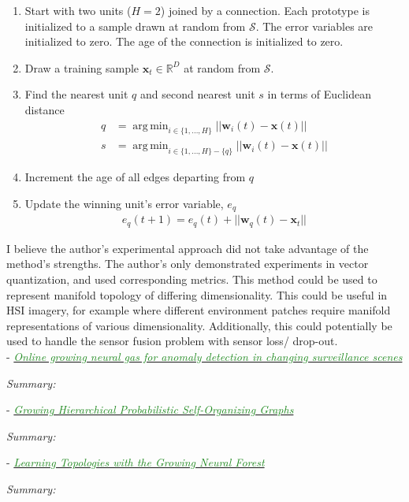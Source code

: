 \documentclass[]{article}
\DeclareMathOperator*{\argmin}{arg\,min}
\newcommand{\paperentry}[4]{
            \hangindent=1cm
            \textcolor{red}{\cite{#1}} - \href{run:../References/#3}{\textcolor{ForestGreen}{\textit{#2}}}
            
            \noindent            
            \begin{minipage}[t]{0.1\linewidth}\hfill\end{minipage}
            \begin{minipage}[t]{0.8\linewidth}\textcolor{NavyBlue}{{\textit{Summary:}}}#4\end{minipage}
            \vspace{.25cm}
          }
\begin{document}
	\begin{enumerate}
		\item Start with two units ($H=2$) joined by a connection.  Each prototype is initialized to a sample drawn at random from $\mathcal{S}$.  The error variables are initialized to zero.  The age of the connection is initialized to zero.
		\item Draw a training sample $\bm{x}_{t} \in \mathbb{R}^{D}$ at random from $\mathcal{S}$.
		\item Find the nearest unit $q$ and second nearest unit $s$ in terms of Euclidean distance
		\begin{align*}	
		q &= \argmin_{i\in \{1,\dots,H \}} ||\bm{w}_{i}(t) - \bm{x}(t)  || \\
		s &= \argmin_{i\in \{1,\dots,H \} - \{q\} } ||\bm{w}_{i}(t) - \bm{x}(t)  ||
		\end{align*}
		\item Increment the age of all edges departing from $q$
		\item  Update the winning unit's error variable, $e_{q}$
		\begin{align*}
		e_{q}(t+1) = e_{q}(t) + || \bm{w}_q(t) - \bm{x}_{t} ||
		\end{align*}
	\end{enumerate}

	\noindent
	I believe the author's experimental approach did not take advantage of the method's strengths.  The author's only demonstrated experiments in vector quantization, and used corresponding metrics.  This method could be used to represent manifold  topology of differing dimensionality. This could be useful in HSI imagery, for example where different environment patches require manifold representations of various dimensionality.  Additionally, this could potentially be used to handle the sensor fusion problem with sensor loss/ drop-out. \\
	
	\paperentry{Sun2016GNGMotionDetection}
	{Online growing neural gas for anomaly detection in changing surveillance scenes}
	{Manifold_Representation_Learning/CHL/Sun2016GNGMotionDetection.pdf}
	{}
	
	\paperentry{LopezRubio2011GHPGraphs}
	{Growing Hierarchical Probabilistic Self-Organizing Graphs}
	{Manifold_Representation_Learning/CHL/LopezRubio2011GHPGraphs.pdf}
	{}
	
	
	\paperentry{Palomo2016GrowingNeuralForest}
	{Learning Topologies with the Growing Neural Forest}
	{Manifold_Representation_Learning/CHL/Palomo2016GrowingNeuralForest.pdf}
	{}
	
\end{document}
